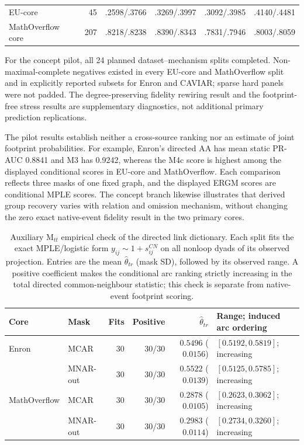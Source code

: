 \documentclass[10pt]{article}
\begin{document}
\begin{table}[H]
\begin{tabular}{@{}P{0.22\textwidth}rrrrr@{}}
EU-core & 45 & .2598/.3766 & .3269/.3997 & .3092/.3985 & .4140/.4481\\
MathOverflow core & 207 & .8218/.8238 & .8390/.8343 & .7831/.7946 & .8003/.8059\\
\bottomrule
\end{tabular}
\par\vspace{3pt}\begin{minipage}{\textwidth}\footnotesize
For the concept pilot, all 24 planned dataset--mechanism splits completed. Non-maximal-complete negatives existed in every EU-core and MathOverflow split and in explicitly reported subsets for Enron and CAVIAR; sparse hard panels were not padded. The degree-preserving fidelity rewiring result and the footprint-free stress results are supplementary diagnostics, not additional primary prediction replications.
\end{minipage}
\end{table}

The pilot results establish neither a cross-source ranking nor an estimate of joint footprint probabilities. For example, Enron's directed AA has mean static PR-AUC 0.8841 and M3 has 0.9242, whereas the M4c score is highest among the displayed conditional scores in EU-core and MathOverflow. Each comparison reflects three masks of one fixed graph, and the displayed ERGM scores are conditional MPLE scores. The concept branch likewise illustrates that derived group recovery varies with relation and omission mechanism, without changing the zero exact native-event fidelity result in the two primary cores.

\begin{table}[H]
\centering
\caption{Auxiliary $\mathrm{M}_{tt}$ empirical check of the directed link dictionary. Each split fits the exact MPLE/logistic form $y_{ij}\sim 1+s^{CN}_{ij}$ on all nonloop dyads of its observed projection. Entries are the mean $\widehat\theta_{tr}$ (mask SD), followed by its observed range. A positive coefficient makes the conditional arc ranking strictly increasing in the total directed common-neighbour statistic; this check is separate from native-event footprint scoring.}
\label{tab:mtt}
\small
\setlength{\tabcolsep}{3pt}
\begin{tabular}{@{}llrrrl@{}}
\toprule
Core & Mask & Fits & Positive & $\widehat\theta_{tr}$ & Range; induced arc ordering\\
\midrule
Enron & MCAR & 30 & 30/30 & $0.5496$ ($0.0156$) & $[0.5192,0.5819]$; increasing\\
 & MNAR-out & 30 & 30/30 & $0.5522$ ($0.0139$) & $[0.5125,0.5785]$; increasing\\
MathOverflow & MCAR & 30 & 30/30 & $0.2878$ ($0.0105$) & $[0.2623,0.3062]$; increasing\\
 & MNAR-out & 30 & 30/30 & $0.2983$ ($0.0114$) & $[0.2734,0.3260]$; increasing\\
\bottomrule
\end{tabular}
\end{table}
\end{document}
